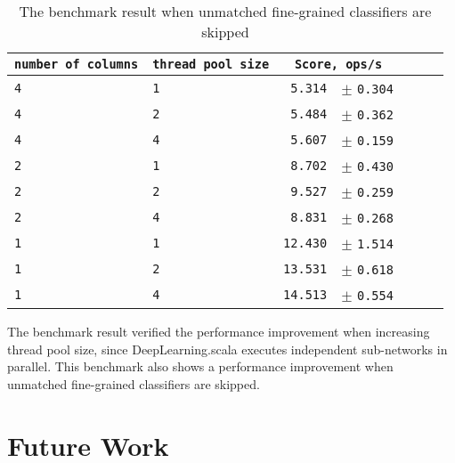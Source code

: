 \begin{table}[htbp]
  \begin{tabular}{l|l|l|l|l|rl}
  \texttt{number of columns} & \texttt{thread pool size} & \multicolumn{2}{c}{\texttt{Score, ops/s}} \\
  \hline
  \texttt{4} & \texttt{1} & \texttt{ 5.314} & \scriptsize $\pm$ \texttt{0.304}  \\
  \texttt{4} & \texttt{2} & \texttt{ 5.484} & \scriptsize $\pm$ \texttt{0.362}  \\
  \texttt{4} & \texttt{4} & \texttt{ 5.607} & \scriptsize $\pm$ \texttt{0.159}  \\
  \texttt{2} & \texttt{1} & \texttt{ 8.702} & \scriptsize $\pm$ \texttt{0.430}  \\
  \texttt{2} & \texttt{2} & \texttt{ 9.527} & \scriptsize $\pm$ \texttt{0.259}  \\
  \texttt{2} & \texttt{4} & \texttt{ 8.831} & \scriptsize $\pm$ \texttt{0.268}  \\
  \texttt{1} & \texttt{1} & \texttt{12.430} & \scriptsize $\pm$ \texttt{1.514}  \\
  \texttt{1} & \texttt{2} & \texttt{13.531} & \scriptsize $\pm$ \texttt{0.618}  \\
  \texttt{1} & \texttt{4} & \texttt{14.513} & \scriptsize $\pm$ \texttt{0.554}  \\
  \end{tabular}
  \caption{The benchmark result when unmatched fine-grained classifiers are skipped}
  \label{benchmark-skip-fine-grained}
\end{table}

The benchmark result verified the performance improvement when increasing thread pool size, since DeepLearning.scala executes independent sub-networks in parallel. This benchmark also shows a performance improvement when unmatched fine-grained classifiers are skipped.

\section{Future Work}

